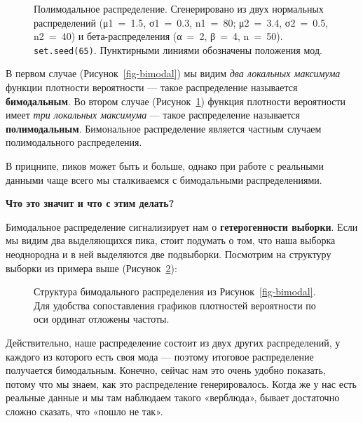 \documentclass[
  letterpaper,
  DIV=11,
  numbers=noendperiod]{scrreprt}
\theoremstyle{definition}
\theoremstyle{remark}
\begin{document}
\begin{figure}


\caption{\label{fig-polymodal}Полимодальное распределение. Сгенерировано
из двух нормальных распределений (μ1~=~1.5, σ1~=~0.3, n1~=~80; μ2~=~3.4,
σ2~=~0.5, n2~=~40) и бета-распределения (α~=~2, β~=~4, n~=~50).
\texttt{set.seed(65)}. Пунктирными линиями обозначены положения мод.}

\end{figure}%

В первом случае (Рисунок~\ref{fig-bimodal}) мы видим \emph{два локальных
максимума} функции плотности вероятности --- такое распределение
называется \textbf{бимодальным}. Во втором случае
(Рисунок~\ref{fig-polymodal}) функция плотности вероятности имеет
\emph{три локальных максимума} --- такое распределение называется
\textbf{полимодальным}. Бимональное распределение является частным
случаем полимодального распределения.

В прицнипе, пиков может быть и больше, однако при работе с реальными
данными чаще всего мы сталкиваемся с бимодальными распределениями.

\textbf{Что это значит и что с этим делать?}

Бимодальное распределение сигнализирует нам о \textbf{гетерогенности
выборки}. Если мы видим два выделяющихся пика, стоит подумать о том, что
наша выборка неоднородна и в ней выделяются две подвыборки. Посмотрим на
структуру выборки из примера выше (Рисунок~\ref{fig-bimodal-struct}):

\begin{figure}


\caption{\label{fig-bimodal-struct}Структура бимодального распределения
из Рисунок~\ref{fig-bimodal}. Для удобства сопоставления графиков
плотностей вероятности по оси ординат отложены частоты.}

\end{figure}%

Действительно, наше распределение состоит из двух других распределений,
у каждого из которого есть своя мода --- поэтому итоговое распределение
получается бимодальным. Конечно, сейчас нам это очень удобно показать,
потому что мы знаем, как это распределение генерировалось. Когда же у
нас есть реальные данные и мы там наблюдаем такого «верблюда», бывает
достаточно сложно сказать, что «пошло не так».
\end{document}
